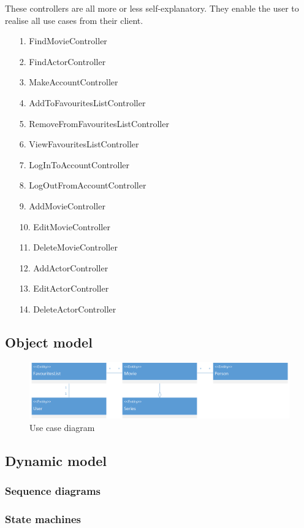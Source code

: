 These controllers are all more or less self-explanatory. They enable the user to realise all use cases from their client.

\begin{enumerate}
	\item[1.] FindMovieController
	\item[2.] FindActorController
	\item[3.] MakeAccountController 
	\item[4.] AddToFavouritesListController
	\item[5.] RemoveFromFavouritesListController
	\item[6.] ViewFavouritesListController
	\item[7.] LogInToAccountController
	\item[8.] LogOutFromAccountController 
	
	\item[9.] AddMovieController
 	\item[10.] EditMovieController
 	\item[11.] DeleteMovieController
 	\item[12.] AddActorController
 	\item[13.] EditActorController
 	\item[14.] DeleteActorController
 	
\end{enumerate}

\subsection{Object model}

\begin{figure}[H]
\includegraphics[width=\linewidth]{img/ClassDiagram.png}
\caption{Use case diagram}
\label{fig:use case diagram}
\end{figure}

\subsection{Dynamic model}



\subsubsection{Sequence diagrams}



\subsubsection{State machines}



\newpage
